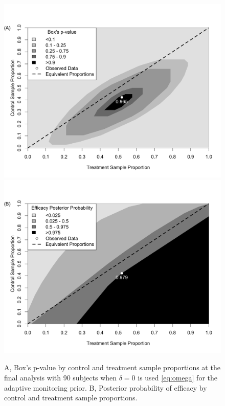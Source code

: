 \documentclass[12pt]{article}
\begin{document}
\begin{figure}[htbp]
\begin{center}
   \includegraphics[width=5.3in]{./figures/2dbayesp.png}
    \includegraphics[width=5.3in]{./figures/2dpostp.png}
    \caption{A, Box's p-value by control and treatment sample proportions at the final analysis with 90 subjects when $\delta=0$ is used \eqref{eq:omega} for the adaptive monitoring prior. B, Posterior probability of efficacy by control and treatment sample proportions.}
\label{fig:2dheatmaps}
 \end{center}
\end{figure}
\end{document}

